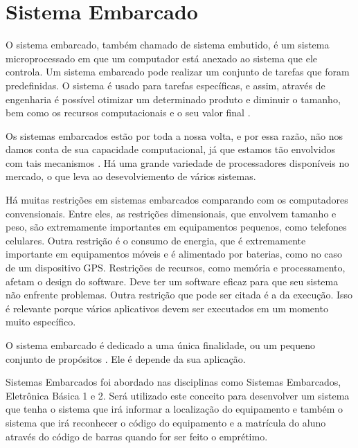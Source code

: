 \section[Sistema Embarcado]{Sistema Embarcado}

O sistema embarcado, também chamado de sistema embutido, é um sistema microprocessado em que um computador está anexado ao sistema que ele controla. Um sistema embarcado pode realizar um conjunto de tarefas que foram predefinidas. O sistema é usado para tarefas específicas, e assim, através de engenharia é possível otimizar um determinado produto e diminuir o tamanho, bem como os recursos computacionais e o seu valor final \cite{embarcado}.

Os sistemas embarcados estão por toda a nossa volta, e por essa razão, não nos damos conta de sua capacidade computacional, já que estamos tão envolvidos com tais mecanismos \cite{embarcado}. Há uma grande variedade de processadores disponíveis no mercado, o que leva ao desevolviemento de vários sistemas.

Há muitas restrições em sistemas embarcados comparando com os computadores convensionais. Entre eles, as restrições dimensionais, que envolvem tamanho e peso, são extremamente importantes em equipamentos pequenos, como telefones celulares. Outra restrição é o consumo de energia, que é extremamente importante em equipamentos móveis e é alimentado por baterias, como no caso de um dispositivo GPS. Restrições de recursos, como memória e processamento, afetam o design do software. Deve ter um software eficaz para que seu sistema não enfrente problemas. Outra restrição que pode ser citada é a da execução. Isso é relevante porque vários aplicativos devem ser executados em um momento muito específico.

O sistema embarcado é dedicado a uma única finalidade, ou um pequeno conjunto de propósitos \cite{embarcado2}. Ele é depende da sua aplicação. 

Sistemas Embarcados foi abordado nas disciplinas como Sistemas Embarcados, Eletrônica Básica 1 e 2. Será utilizado este conceito para desenvolver um sistema que tenha o sistema que irá informar a localização do equipamento e também o sistema que irá reconhecer o código do equipamento e a matrícula do aluno através do código de barras quando for ser feito o emprétimo. 
